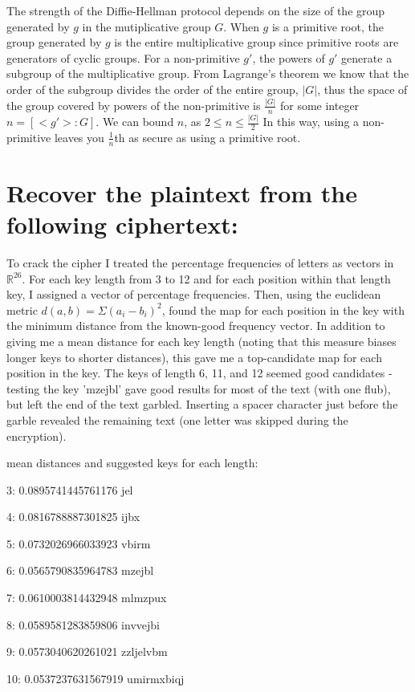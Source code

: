 \documentclass[]{article}
\begin{document}
The strength of the Diffie-Hellman protocol depends on the size of the group generated by $g$ in the mutiplicative group $G$.  When $g$ is a primitive root, the group generated by $g$ is the entire multiplicative group since primitive roots are generators of cyclic groups.  For a non-primitive $g'$, the powers of $g'$ generate a subgroup of the multiplicative group.  From Lagrange's theorem we know that the order of the subgroup divides the order of the entire group, $|G|$, thus the space of the group covered by powers of the non-primitive is $\frac{|G|}{n}$ for some integer $n = [<g'>:G]$.  We can bound $n$, as $2 \le n \le \frac{|G|}{2}$  In this way, using a non-primitive leaves you $\frac{1}{n}$th as secure as using a primitive root.

\section{Recover the plaintext from the following ciphertext:}
To crack the cipher I treated the percentage frequencies of letters as vectors in $\mathbb{R}^{26}$.  For each key length from 3 to 12 and for each position within that length key, I assigned a vector of percentage frequencies.  Then, using the euclidean metric $d(a, b) = \Sigma(a_i - b_i)^2$, found the map for each position in the key with the minimum distance from the known-good frequency vector.  In addition to giving me a mean distance for each key length (noting that this measure biases longer keys to shorter distances), this gave me a top-candidate map for each position in the key.  The keys of length 6, 11, and 12 seemed good candidates - testing the key 'mzejbl' gave good results for most of the text (with one flub), but left the end of the text garbled.  Inserting a spacer character just before the garble revealed the remaining text (one letter was skipped during the encryption).

mean distances and suggested keys for each length:

3:	0.0895741445761176	jel

4:	0.0816788887301825	ijbx

5:	0.0732026966033923	vbirm

6:	0.0565790835964783	mzejbl

7:	0.0610003814432948	mlmzpux

8:	0.0589581283859806	invvejbi

9:	0.0573040620261021	zzljelvbm

10:	0.0537237631567919	umirmxbiqj
\end{document}
